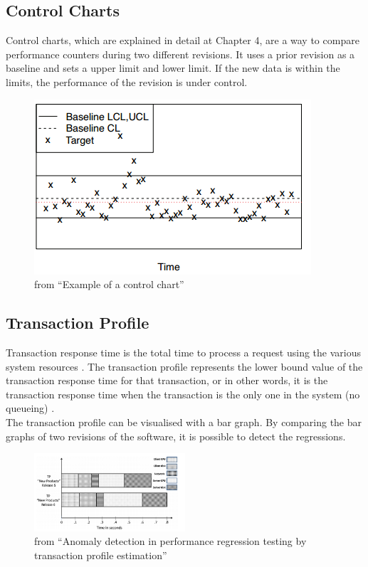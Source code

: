 \subsection{Control Charts}
Control charts, which are explained in detail at Chapter 4, are a way to compare performance counters during two different revisions. It uses a prior revision as a baseline and sets a upper limit and lower limit. If the new data is within the limits, the performance of the revision is under control.
\begin{figure}[h]
\begin{center}
  \includegraphics[scale=0.7]{Figures/controlchart.png}
\end{center}
  \caption{from ``Example of a control chart''\cite{nguyen2012using}}
  \label{figure:control_chart}

\end{figure}

\subsection{Transaction Profile}
Transaction response time is the total time to process a request using the various
system resources \cite{jain2008art}. The transaction profile represents the lower bound value of the transaction response time for that transaction, or in other words, it is the
transaction response time when the transaction is the only one in the system (no queueing) \cite{ghaith2015anomaly}.\\
The transaction profile can be visualised with a bar graph. By comparing the bar graphs of two revisions of the software, it is possible to detect the regressions.

\begin{figure}[h]
\begin{center}
  \includegraphics[width=0.5\textwidth]{Figures/TP.png}
\end{center}
  \caption{from ``Anomaly detection in performance regression testing by transaction profile estimation''\cite{ghaith2015anomaly}}

\end{figure}

